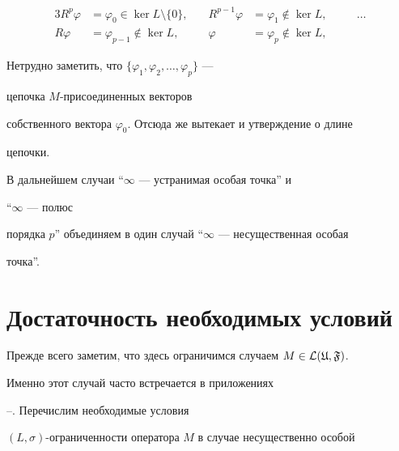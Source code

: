 \begin{pf}
\begin{alignat*}{3}
R^p\varphi&=\varphi_0\in\ker L\setminus\{0\}, &\quad 


R^{p-1}\varphi&=\varphi_1\not\in\ker L, &\quad &\dotsc \\ 


%


R\varphi&=\varphi_{p-1}\not\in\ker L, &\quad 


\varphi&=\varphi_p\not\in\ker L, &\quad & \ 


\end{alignat*} 


 


%


Нетрудно заметить, что $\{\varphi_1,\varphi_2,\dotsc,\varphi_p\}$ --- 


цепочка $M$-присоединенных векторов 


собственного вектора $\varphi_0$. Отсюда же вытекает и утверждение о длине 


цепочки. 


\end{pf} 


 




\begin{notes} В дальнейшем случаи ``$\infty$ --- устранимая особая точка'' и 


``$\infty$ --- полюс 


порядка $p$'' объединяем в один случай ``$\infty$ --- несущественная особая 


точка''. 


\end{notes} 


 


\section{Достаточность необходимых условий} 


 


Прежде всего заметим, что здесь ограничимся случаем $M\in\cal L(\frak U,\frak F)$. 


Именно этот случай часто встречается в приложениях 


\cite{S8}--\cite{S10}. Перечислим необходимые условия 


$(L,\sigma)$-ограниченности оператора $M$ в случае несущественно особой 


